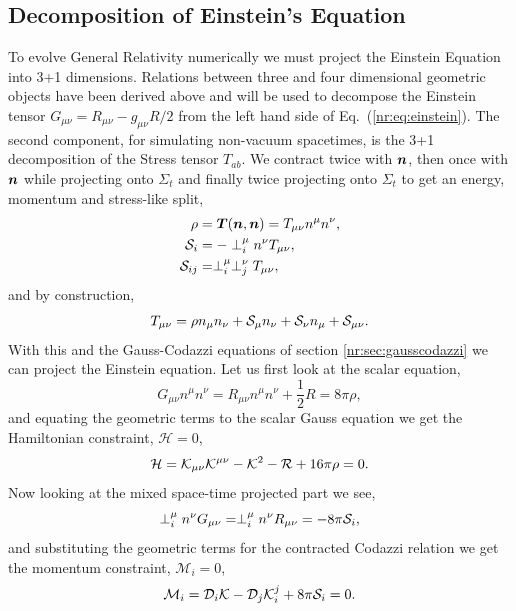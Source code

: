 \subsection{Decomposition of Einstein's Equation} \label{nr:sec:einsteindecomp}
To evolve General Relativity numerically we must project the Einstein Equation into 3+1 dimensions. Relations between three and four dimensional geometric objects have been derived above and will be used to decompose the Einstein tensor $G_{\mu\nu} = R_{\mu\nu}-g_{\mu\nu}R/2$ from the left hand side of Eq.~(\ref{nr:eq:einstein}). The second component, for simulating non-vacuum spacetimes, is the 3+1 decomposition of the Stress tensor $T_{ab}$. We contract twice with $\bs{n}$, then once with $\bs{n}$ while projecting onto $\Sigma_t$ and finally twice projecting onto $\Sigma_t$ to get an energy, momentum and stress-like split,
\begin{align} \rho &= \bs{T}(\bs{n},\bs{n}) = T_{\mu \nu}n^\mu n^\nu,\label{nr:eq:Tdecomp1}\\
 \S_i &=  -\perp_i^\mu  n^\nu T_{\mu \nu}, \label{nr:eq:Tdecomp2}\\
\S_{ij} &= \perp^\mu _i\perp^\nu_j T_{\mu \nu},\label{nr:eq:Tdecomp3}\end{align}
and by construction,
\begin{equation} T_{\mu \nu} = \rho n_\mu  n_\nu + \S_\mu  n_\nu + \S_\nu n_\mu  + \S_{\mu \nu}.\end{equation}
With this and the Gauss-Codazzi equations of section \ref{nr:sec:gausscodazzi} we can project the Einstein equation. Let us first look at the scalar equation,
\begin{equation} G_{\mu\nu}n^\mu n^\nu = R_{\mu\nu}n^\mu n^\nu + \frac{1}{2}R = 8\pi \rho,\end{equation}
and equating the geometric terms to the scalar Gauss equation we get the Hamiltonian constraint, $\mathcal{H}=0$,
\begin{equation}\mathcal{H} = \K_{\mu\nu}\K^{\mu\nu}-\K^2 -\R + 16\pi \rho  =0.\label{nr:eq:ham}\end{equation}
Now looking at the mixed space-time projected part we see,
\begin{equation} \perp^\mu_i n^\nu G_{\mu\nu} =  \perp^\mu_i n^\nu R_{\mu\nu} = -8\pi\S_i,\end{equation}
and substituting the geometric terms for the contracted Codazzi relation we get the momentum constraint, $\mathcal{M}_i = 0$,
\begin{equation} \mathcal{M}_i = \D_i \K - \D_j\K^j_i  + 8\pi \S_i=0. \label{nr:eq:mom}\end{equation}
